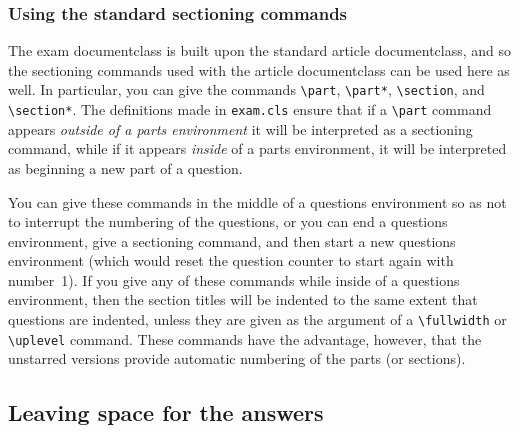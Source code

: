\documentclass[12pt]{exam}
\begin{document}
\subsubsection{Using the standard sectioning commands}

The exam documentclass is built upon the standard article
documentclass, and so the sectioning commands used with the article
documentclass can be used here as well.  In particular, you can give
the commands \verb"\part", \verb"\part*", \verb"\section", and
\verb"\section*".  The definitions made in \verb"exam.cls" ensure that
if a \verb"\part" command appears \emph{outside of a parts
  environment} it will be interpreted as a sectioning command, while
if it appears \emph{inside} of a parts environment, it will be
interpreted as beginning a new part of a question.



You can give these commands in the middle of a questions environment
so as not to interrupt the numbering of the questions, or you can end
a questions environment, give a sectioning command, and then start a
new questions environment (which would reset the question counter
to start again with number~1).  If you give any of these commands
while inside of a questions environment, then the section titles will
be indented to the same extent that questions are indented, unless
they are given as the argument of a \verb"\fullwidth" or
\verb"\uplevel" command.  These
commands have the advantage, however, that the unstarred versions
provide automatic numbering of the parts (or sections).
\subsection{Leaving space for the answers}
\label{sec:LeaveSpace}
\end{document}
